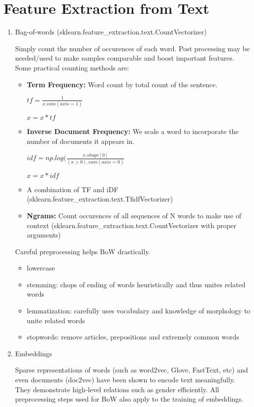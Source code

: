 \documentclass[a4paper]{article}
\begin{document}
\section{Feature Extraction from Text}
\begin{enumerate}
\item Bag-of-words (sklearn.feature\_extraction.text.CountVectorizer)

	Simply count the number of occurences of each word. Post processing may be needed/used to make samples comparable and boost important features. Some practical counting methods are:
	\begin{itemize}
	\item \textbf{Term Frequency:} Word count by total count of the sentence.
	
		$tf = \frac{1}{x.sum(axis=1)}$
		
		$x = x*tf$
	\item \textbf{Inverse Document Frequency:} We scale a word to incorporate the number of documents it appears in.
	
		$idf = np.log(\frac{x.shape[0]}{(x>0).sum(axis=0)}$
		
		$x = x*idf$
	\item A combination of TF and iDF (sklearn.feature\_extraction.text.TfidfVectorizer)
	\item \textbf{Ngrams:} Count occurences of all sequences of N words to make use of context (sklearn.feature\_extraction.text.CountVectorizer with proper arguments)	
	\end{itemize}
	Careful preprocessing helps BoW drastically.
	\begin{itemize}
	\item lowercase
	\item stemming: chops of ending of words heuristically and thus unites related words 
	\item lemmatization: carefully uses vocabulary and knowledge of morphology to unite related words
	\item stopwords: remove articles, prepositions and extremely common words
	\end{itemize}
\item Embeddings

	Sparse representations of words (such as word2vec, Glove, FastText, etc) and even documents (doc2vec) have been shown to encode text meaningfully. They demonstrate high-level relations such as gender efficiently. All preprocessing steps used for BoW also apply to the training of embeddings.
\end{enumerate}
\end{document}
